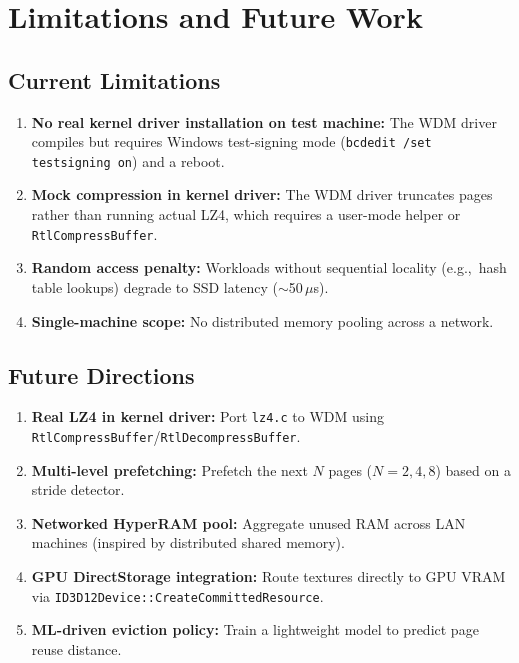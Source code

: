 \documentclass[11pt,a4paper]{article}
\newcommand{\code}[1]{\texttt{#1}}
\newcommand{\micro}{$\mu$}
\begin{document}
\section{Limitations and Future Work}
\label{sec:limitations}

\subsection{Current Limitations}

\begin{enumerate}[nosep]
    \item \textbf{No real kernel driver installation on test machine:} The WDM driver compiles but requires Windows test-signing mode (\code{bcdedit /set testsigning on}) and a reboot.
    \item \textbf{Mock compression in kernel driver:} The WDM driver truncates pages rather than running actual LZ4, which requires a user-mode helper or \code{RtlCompressBuffer}.
    \item \textbf{Random access penalty:} Workloads without sequential locality (e.g.,~hash table lookups) degrade to SSD latency ($\sim$50\,\micro{}s).
    \item \textbf{Single-machine scope:} No distributed memory pooling across a network.
\end{enumerate}

\subsection{Future Directions}

\begin{enumerate}[nosep]
    \item \textbf{Real LZ4 in kernel driver:} Port \code{lz4.c} to WDM using \code{RtlCompressBuffer}/\code{RtlDecompressBuffer}.
    \item \textbf{Multi-level prefetching:} Prefetch the next $N$ pages ($N = 2, 4, 8$) based on a stride detector.
    \item \textbf{Networked HyperRAM pool:} Aggregate unused RAM across LAN machines (inspired by distributed shared memory).
    \item \textbf{GPU DirectStorage integration:} Route textures directly to GPU VRAM via \code{ID3D12Device::CreateCommittedResource}.
    \item \textbf{ML-driven eviction policy:} Train a lightweight model to predict page reuse distance.
\end{enumerate}
\end{document}
